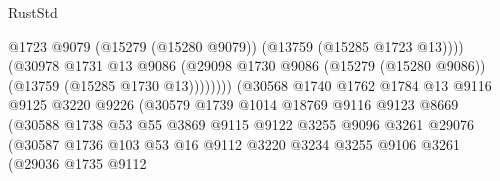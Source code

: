 \begin{lexlean}{RustStd}
\begin{coremodule}
                                              @1723
                                              @9079
                                              (@15279 (@15280 @9079))
                                              (@13759 (@15285 @1723 @13))))
                                          (@30978
                                            @1731
                                            @13
                                            @9086
                                            (@29098
                                              @1730
                                              @9086
                                              (@15279 (@15280 @9086))
                                              (@13759 (@15285 @1730 @13))))))))
                                  (@30568
                                    @1740
                                    @1762
                                    @1784
                                    @13
                                    @9116
                                    @9125
                                    @3220
                                    @9226
                                    (@30579
                                      @1739
                                      @1014
                                      @18769
                                      @9116
                                      @9123
                                      @8669
                                      (@30588
                                        @1738
                                        @53
                                        @55
                                        @3869
                                        @9115
                                        @9122
                                        @3255
                                        @9096
                                        @3261
                                        @29076
                                        (@30587
                                          @1736
                                          @103
                                          @53
                                          @16
                                          @9112
                                          @3220
                                          @3234
                                          @3255
                                          @9106
                                          @3261
                                          (@29036
                                            @1735
                                            @9112

\end{coremodule}
\end{lexlean}
